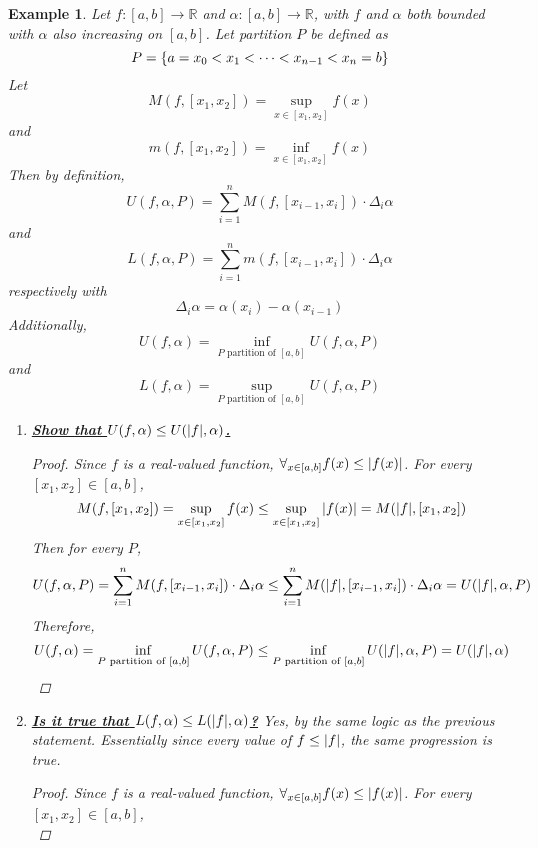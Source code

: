\documentclass[]{article}
\newcommand{\R}{\mathbb{R}}
\newtheorem{example}{Example}
\begin{document}
\begin{example}
    Let $f : [a,b] \to \R$ and $\alpha : [a,b] \to \R$, with $f$ and $\alpha$ both bounded with $\alpha$ also increasing on $[a,b]$.
    Let partition $P$ be defined as \[
        P = \qty{a = x_0 < x_1 < \cdots < x_{n-1} < x_n = b}
    \] Let \[
        M(f, [x_1, x_2]) = \sup_{x \in [x_1, x_2]} f(x)
    \] and \[
        m(f, [x_1, x_2]) = \inf_{x \in [x_1, x_2]} f(x)
    \] Then by definition, \[            
        U(f, \alpha, P) = \sum_{i=1}^{n} M(f, [x_{i-1}, x_i]) \cdot \Delta_i \alpha
    \] and \[
        L(f, \alpha, P) = \sum_{i=1}^{n} m(f, [x_{i-1}, x_i]) \cdot \Delta_i \alpha
    \] respectively with \[
        \Delta_i \alpha = \alpha(x_i) - \alpha(x_{i-1})
    \] Additionally, \[            
        U(f, \alpha) = \inf_{P \text{ partition of } [a,b]} U(f, \alpha, P)
    \] and \[
        L(f, \alpha) = \sup_{P \text{ partition of } [a,b]} U(f, \alpha, P)
    \]
    \begin{enumerate}
        \item \emph{\underline{\textbf{Show that $U(f,\alpha) \leq U(\abs{f},\alpha)$.}}} \begin{proof}
            Since $f$ is a real-valued function, $\forall_{x \in [a,b]} f(x) \leq \abs{f(x)}$. 
            For every $[x_1,x_2] \in [a,b]$, \[
                M(f, [x_1, x_2]) 
                    = \sup_{x \in [x_1, x_2]} f(x) 
                    \leq \sup_{x \in [x_1, x_2]} \abs{f(x)} 
                = M(\abs{f}, [x_1, x_2])
            \] Then for every $P$, \[
                U(f, \alpha, P) 
                    = \sum_{i=1}^{n} M(f, [x_{i-1}, x_i]) \cdot \Delta_i \alpha 
                    \leq \sum_{i=1}^{n} M(\abs{f}, [x_{i-1}, x_i]) \cdot \Delta_i \alpha 
                = U(\abs{f}, \alpha, P)
            \] Therefore, \[
                U(f, \alpha) 
                    = \inf_{P \text{ partition of } [a,b]} U(f, \alpha, P)
                    \leq \inf_{P \text{ partition of } [a,b]} U(\abs{f}, \alpha, P)
                = U(\abs{f}, \alpha)
            \]
        \end{proof}
        \item \emph{\textbf{\underline{Is it true that $L(f,\alpha) \leq L(\abs{f},\alpha)$?}}} 
        Yes, by the same logic as the previous statement. 
        Essentially since every value of $f \leq \abs{f}$, the same progression is true.
        \begin{proof}
            Since $f$ is a real-valued function, $\forall_{x \in [a,b]} f(x) \leq \abs{f(x)}$. 
            For every $[x_1,x_2] \in [a,b]$, \[
\]
\end{proof}
\end{enumerate}
\end{example}
\end{document}
